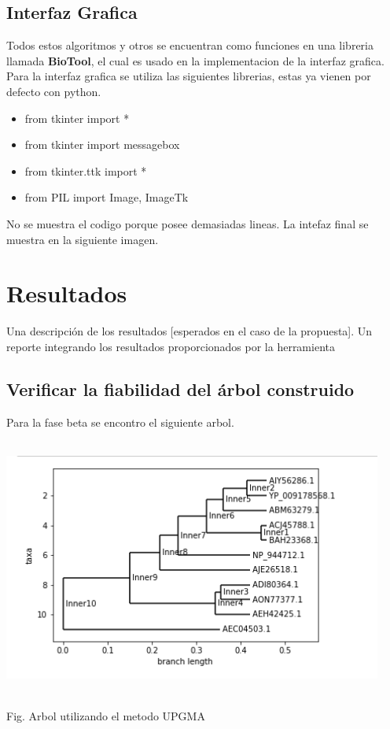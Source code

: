 \documentclass[a4paper]{article}
\begin{document}
\subsection{Interfaz Grafica}
\noindent Todos estos algoritmos y otros se encuentran como funciones en una libreria llamada \textbf{BioTool}, el cual es usado en la implementacion de la interfaz grafica.
Para la interfaz grafica se utiliza las siguientes librerias, estas ya vienen por defecto con python.
\begin{itemize}

\item from tkinter import *
\item from tkinter import messagebox
\item from tkinter.ttk import *
\item from PIL import Image, ImageTk

\end{itemize}
No se muestra el codigo porque posee demasiadas lineas. La intefaz final se muestra en la siguiente imagen.



\section{Resultados}
Una descripción de los resultados [esperados en el caso de la propuesta]. Un reporte integrando los resultados proporcionados por la herramienta

\subsection{Verificar la fiabilidad del árbol construido}
Para la fase beta se encontro el siguiente arbol.

\begin{center}
	\includegraphics[width=12.5cm,height=8.5cm]{arbol.png}
	
	Fig. Arbol utilizando el metodo UPGMA
\end{center}
\end{document}
